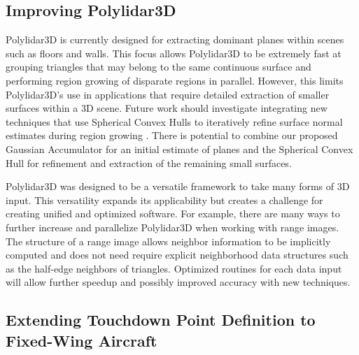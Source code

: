 \subsection{Improving Polylidar3D}

Polylidar3D is currently designed for extracting dominant planes within scenes such as floors and walls. This focus allows Polylidar3D to be extremely fast at grouping triangles that may belong to the same continuous surface and performing region growing of disparate regions in parallel. However, this limits Polylidar3D's use in applications that require detailed extraction of smaller surfaces within a 3D scene. Future work should investigate integrating new techniques that use Spherical Convex Hulls to iteratively refine surface normal estimates during region growing \cite{mols_highly_2020}. There is potential to combine our proposed Gaussian Accumulator for an initial estimate of planes and the Spherical Convex Hull for refinement and extraction of the remaining small surfaces. 

Polylidar3D was designed to be a versatile framework to take many forms of 3D input.  This versatility expands its applicability but creates a challenge for creating unified and optimized software. For example, there are many ways to further increase and parallelize Polylidar3D when working with range images. The structure of a range image allows neighbor information to be implicitly computed and does not need require explicit neighborhood data structures such as the half-edge neighbors of triangles. Optimized routines for each data input will allow further speedup and possibly improved accuracy with new techniques.

\subsection{Extending Touchdown Point Definition to Fixed-Wing Aircraft}

